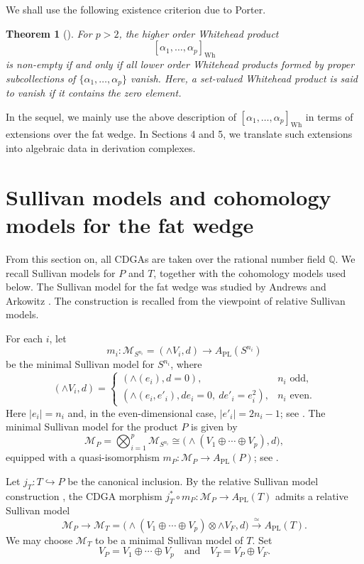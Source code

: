 \documentclass[a4paper,10pt]{amsart}
\newtheorem{thm}{Theorem}[section]
\theoremstyle{definition}
\theoremstyle{remark}
\numberwithin{equation}{section}
\begin{document}
We shall use the following existence criterion due to Porter.

\begin{thm}[{\cite[Theorem 2.7]{Po1965}}]\label{thm:porter}
For $p>2$, the higher order Whitehead product
\[
[\alpha_1,\ldots,\alpha_p]_{\mathrm{Wh}}
\]
is non-empty if and only if all lower order Whitehead products formed by
proper subcollections of $\{\alpha_1,\ldots,\alpha_p\}$ vanish.
Here, a set-valued Whitehead product is said to vanish if it contains the
zero element.
\end{thm}

In the sequel, we mainly use the above description of
$[\alpha_1,\ldots,\alpha_p]_{\mathrm{Wh}}$
in terms of extensions over the fat wedge. In Sections 4 and 5, we translate
such extensions into algebraic data in derivation complexes.





\section{Sullivan models and cohomology models for the fat wedge}

From this section on, all CDGAs are taken over the rational number field
$\mathbb{Q}$. 
We recall Sullivan models for $P$ and $T$, together with the cohomology
models used below.
The Sullivan model for the fat wedge was studied by Andrews and Arkowitz
\cite[Section~4]{AA1978}. The construction is recalled from the viewpoint of
relative Sullivan models.

For each $i$, let
\[
m_i:\mathcal M_{S^{n_i}}=(\wedge V_i,d)
\longrightarrow A_{\mathrm{PL}}(S^{n_i})
\]
be the minimal Sullivan model for $S^{n_i}$, where
\[
(\wedge V_i,d)
=
\begin{cases}
(\wedge(e_i),d=0), & n_i \text{ odd},\\[2mm]
(\wedge(e_i,e'_i),de_i=0,\ de'_i=e_i^2), & n_i \text{ even}.
\end{cases}
\]
Here $|e_i|=n_i$ and, in the even-dimensional case,
$|e'_i|=2n_i-1$; see \cite[\S 12(a), Example~1]{FHT}.
The minimal Sullivan model for the product $P$ is given by
\[
\mathcal M_P
=
\bigotimes_{i=1}^p \mathcal M_{S^{n_i}}
\cong
\bigl(\wedge(V_1\oplus\cdots\oplus V_p),d\bigr),
\]
equipped with a quasi-isomorphism
$m_P:\mathcal M_P\to A_{\mathrm{PL}}(P)$; see
\cite[\S 12(a), Example~2]{FHT}.

Let $j_T:T\hookrightarrow P$ be the canonical inclusion.
By the relative Sullivan model construction
\cite[Proposition~14.3]{FHT}, the CDGA morphism
$
j_T^*\circ m_P:\mathcal M_P\to A_{\mathrm{PL}}(T)
$
admits a relative Sullivan model
\[
\mathcal M_P
\longrightarrow
\mathcal M_T
=
\bigl(\wedge(V_1\oplus\cdots\oplus V_p)\otimes\wedge V_F,d\bigr)
\xrightarrow{\simeq}
A_{\mathrm{PL}}(T).
\]
We may choose $\mathcal M_T$ to be a minimal Sullivan model of $T$.
Set
\[
V_P=V_1\oplus\cdots\oplus V_p
\quad
\text{and}
\quad
V_T=V_P\oplus V_F.
\]
\end{document}
